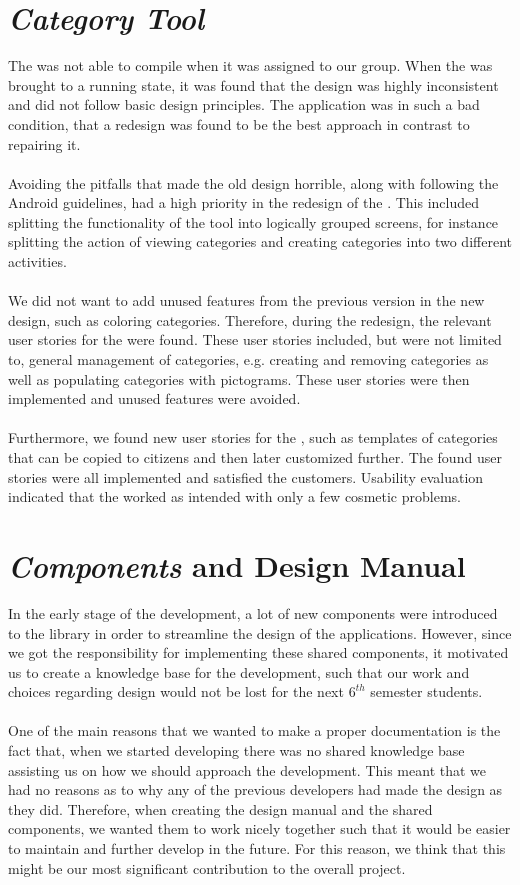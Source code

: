 \section*{\emph{Category Tool}}
The \ct was not able to compile when it was assigned to our group. When the \ct was brought to a running state, it was found that the design was highly inconsistent and did not follow basic design principles. The application was in such a bad condition, that a redesign was found to be the best approach in contrast to repairing it.
\\\\
Avoiding the pitfalls that made the old design horrible, along with following the Android guidelines, had a high priority in the redesign of the \ct. This included splitting the functionality of the tool into logically grouped screens, for instance splitting the action of viewing categories and creating categories into two different activities.
\\\\
We did not want to add unused features from the previous version in the new design, such as coloring categories. Therefore, during the redesign, the relevant user stories for the \ct were found. These user stories included, but were not limited to, general management of categories, e.g. creating and removing categories as well as populating categories with pictograms. These user stories were then implemented and unused features were avoided. 
\\\\
Furthermore, we found new user stories for the \ct, such as templates of categories that can be copied to citizens and then later customized further. The found user stories were all implemented and satisfied the customers. Usability evaluation indicated that the \ct worked as intended with only a few cosmetic problems.

\section*{\giraf \emph{Components} and Design Manual}
In the early stage of the development, a lot of new components were introduced to the \gc library in order to streamline the design of the \giraf applications. However, since we got the responsibility for implementing these shared components, it motivated us to create a knowledge base for the development, such that our work and choices regarding design would not be lost for the next $6^{th}$ semester students. 
\\\\
One of the main reasons that we wanted to make a proper documentation is the fact that, when we started developing there was no shared knowledge base assisting us on how we should approach the development. This meant that we had no reasons as to why any of the previous \giraf developers had made the design as they did. Therefore, when creating the design manual and the shared components, we wanted them to work nicely together such that it would be easier to maintain and further develop in the future. For this reason, we think that this might be our most significant contribution to the overall project.